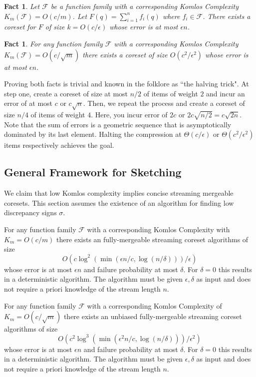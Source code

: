 \documentclass[anon,12pt]{colt2019} %
\newtheorem{fact}[theorem]{Fact}
\newcommand{\eps}{\epsilon}
\newcommand{\F}{\mathcal{F}}
\begin{document}
\begin{fact}
Let $\F$ be a function family with a corresponding Komlos Complexity $K_m(\F) = O(c/m)$. Let $F(q) = \sum_{i=1}^{n}f_i(q)$ where $f_i \in \F$. There exists a coreset for $F$ of size $k = O(c/\eps)$ whose error is at most $\eps n$.
\end{fact}
\begin{fact}
For any function family $\F$ with a corresponding Komlos Complexity $K_m(\F) = O(c/\sqrt{m})$ there exists a coreset of size 
$O(c^2/\eps^2)$ whose error is at most $\eps n$.
\end{fact}

\noindent Proving both facts is trivial and known in the folklore as ``the halving trick". 
At step one, create a coreset of size at most $n/2$ of items of weight $2$ and incur an error of at most $c$ or $c \sqrt{n}$.
Then, we repeat the process and create a coreset of size $n/4$ of items of weight $4$. Here, you incur error of $2c$ or $2c\sqrt{n/2}  = c\sqrt{2n}$.
Note that the sum of errors is a geometric sequence that is asymptotically dominated by its last element. 
Halting the compression at $\Theta(c/\eps)$ or $\Theta(c^2/\eps^2)$ items respectively achieves the goal.



\subsection{General Framework for Sketching}\label{sec:sketch}
We claim that low Komlos complexity implies concise streaming mergeable coresets. 
This section assumes the existence of an algorithm for finding low discrepancy signs $\sigma$.

\begin{theorem} \label{thm:streaming}
For any function family $\F$ with a corresponding Komlos Complexity with $K_m = O(c/m)$ there exists an fully-mergeable streaming coreset algorithms of size 
$$O\left(c\log^2\left(\min(\eps n/c, \log(n/\delta)) \right)/\eps\right)$$ 
whose error is at most $\eps n$ and failure probability at most $\delta$. For $\delta=0$ this results in a deterministic algorithm. The algorithm must be given $\eps, \delta$ as input and does not require a priori knowledge of the stream length $n$.
\end{theorem}

\begin{theorem} \label{thm:streaming2}
For any function family $\F$ with a corresponding Komlos Complexity of $K_m = O(c/\sqrt{m})$ there exists an unbiased fully-mergeable streaming coreset algorithms of size 
$$O\left(c^2\log^3\left(\min(\eps^2 n/c, \log(n/\delta)) \right)/\eps^2\right)$$ 
whose error is at most $\eps n$ and failure probability at most $\delta$. For $\delta=0$ this results in a deterministic algorithm. The algorithm must be given $\eps, \delta$ as input and does not require a priori knowledge of the stream length $n$.
\end{theorem}
\end{document}
